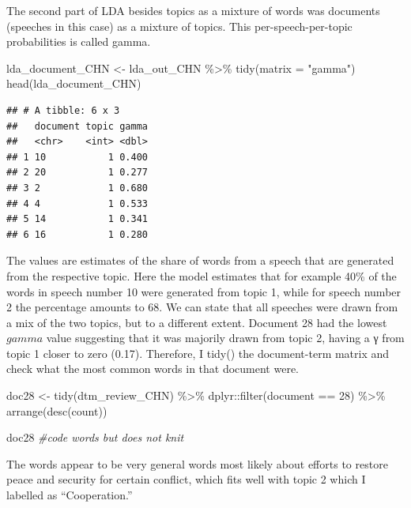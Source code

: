 \documentclass[
]{article}
\newenvironment{Shaded}{\begin{snugshade}}{\end{snugshade}}
\newcommand{\AttributeTok}[1]{\textcolor[rgb]{0.77,0.63,0.00}{#1}}
\newcommand{\CommentTok}[1]{\textcolor[rgb]{0.56,0.35,0.01}{\textit{#1}}}
\newcommand{\DecValTok}[1]{\textcolor[rgb]{0.00,0.00,0.81}{#1}}
\newcommand{\FunctionTok}[1]{\textcolor[rgb]{0.00,0.00,0.00}{#1}}
\newcommand{\NormalTok}[1]{#1}
\newcommand{\OtherTok}[1]{\textcolor[rgb]{0.56,0.35,0.01}{#1}}
\newcommand{\SpecialCharTok}[1]{\textcolor[rgb]{0.00,0.00,0.00}{#1}}
\newcommand{\StringTok}[1]{\textcolor[rgb]{0.31,0.60,0.02}{#1}}
\begin{document}
The second part of LDA besides topics as a mixture of words was
documents (speeches in this case) as a mixture of topics. This
per-speech-per-topic probabilities is called gamma.

\begin{Shaded}
\begin{Highlighting}[]
\NormalTok{lda\_document\_CHN }\OtherTok{\textless{}{-}}\NormalTok{ lda\_out\_CHN }\SpecialCharTok{\%\textgreater{}\%}  
 \FunctionTok{tidy}\NormalTok{(}\AttributeTok{matrix =} \StringTok{"gamma"}\NormalTok{) }
\FunctionTok{head}\NormalTok{(lda\_document\_CHN)}
\end{Highlighting}
\end{Shaded}

\begin{verbatim}
## # A tibble: 6 x 3
##   document topic gamma
##   <chr>    <int> <dbl>
## 1 10           1 0.400
## 2 20           1 0.277
## 3 2            1 0.680
## 4 4            1 0.533
## 5 14           1 0.341
## 6 16           1 0.280
\end{verbatim}

The values are estimates of the share of words from a speech that are
generated from the respective topic. Here the model estimates that for
example 40\% of the words in speech number 10 were generated from topic
1, while for speech number 2 the percentage amounts to 68. We can state
that all speeches were drawn from a mix of the two topics, but to a
different extent. Document 28 had the lowest \(gamma\) value suggesting
that it was majorily drawn from topic 2, having a γ from topic 1 closer
to zero (0.17). Therefore, I tidy() the document-term matrix and check
what the most common words in that document were.

\begin{Shaded}
\begin{Highlighting}[]
\NormalTok{doc28 }\OtherTok{\textless{}{-}} \FunctionTok{tidy}\NormalTok{(dtm\_review\_CHN) }\SpecialCharTok{\%\textgreater{}\%}
\NormalTok{  dplyr}\SpecialCharTok{::}\FunctionTok{filter}\NormalTok{(document }\SpecialCharTok{==} \DecValTok{28}\NormalTok{) }\SpecialCharTok{\%\textgreater{}\%}
  \FunctionTok{arrange}\NormalTok{(}\FunctionTok{desc}\NormalTok{(count))}

\NormalTok{doc28  }\CommentTok{\#code words but does not knit}
\end{Highlighting}
\end{Shaded}

The words appear to be very general words most likely about efforts to
restore peace and security for certain conflict, which fits well with
topic 2 which I labelled as ``Cooperation.''
\end{document}
